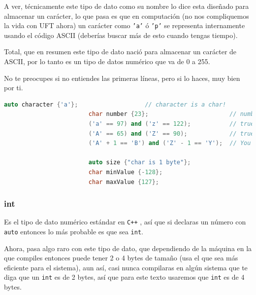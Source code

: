 \documentclass[12pt, fleqn]{report}                             %
\theoremstyle{break}                                            %
\newcommand \Cpp  {\texttt{C++} }                               %
\begin{document}
                    A ver, técnicamente este tipo de dato como su nombre lo dice esta diseñado para almacenar
                    un carácter, lo que pasa es que en computación (no nos compliquemos la vida con UFT ahora)
                    un carácter como \texttt{'a'} ó \texttt{'p'} se representa internamente usando el código
                    ASCII (deberías buscar más de esto cuando tengas tiempo).
                    
                    Total, que en resumen este tipo de dato nació para almacenar un carácter de ASCII, 
                    por lo tanto es un tipo de datos numérico que va de 0 a 255.

                    No te preocupes si no entiendes las primeras líneas, pero si lo haces, muy bien por ti.
                    \begin{lstlisting}[language=C++, gobble=24]
                        auto character {'a'};                   // character is a char!
                        char number {23};                       // number is a char!
                        ('a' == 97) and ('z' == 122);           // true: ASCII is numbers
                        ('A' == 65) and ('Z' == 90);            // true: ASCII is numbers
                        ('A' + 1 == 'B') and ('Z' - 1 == 'Y');  // You can do arithmetic

                        auto size {"char is 1 byte"};
                        char minValue {-128};
                        char maxValue {127};
                    \end{lstlisting}


                \clearpage
                \subsubsection{int}

                    Es el tipo de dato numérico estándar en \Cpp, así que si declaras un número
                    con \texttt{auto} entonces lo más probable es que sea \texttt{int}.

                    Ahora, pasa algo raro con este tipo de dato, que dependiendo de la máquina
                    en la que compiles entonces puede tener 2 o 4 bytes de tamaño (usa el que
                    sea más eficiente para el sistema), aun así, casi nunca compilaras en 
                    algún sistema que te diga que un \texttt{int} es de 2 bytes, así que para
                    este texto usaremos que \texttt{int} es de 4 bytes.
                    
\end{document}
